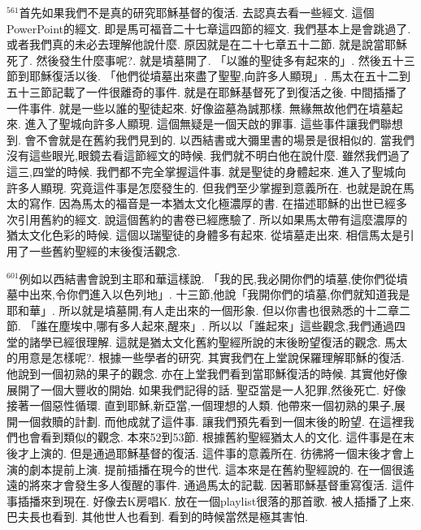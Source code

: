 \documentclass{book}
\begin{document}
$^{561}$首先如果我們不是真的研究耶穌基督的復活.
去認真去看一些經文.
這個PowerPoint的經文.
即是馬可福音二十七章這四節的經文.
我們基本上是會跳過了.
或者我們真的未必去理解他說什麼.
原因就是在二十七章五十二節.
就是說當耶穌死了.
然後發生什麼事呢?.
就是墳墓開了.
「以誰的聖徒多有起來的」.
然後五十三節到耶穌復活以後.
「他們從墳墓出來盡了聖聖,向許多人顯現」.
馬太在五十二到五十三節記載了一件很離奇的事件.
就是在耶穌基督死了到復活之後.
中間插播了一件事件.
就是一些以誰的聖徒起來.
好像盜墓為誠那樣.
無緣無故他們在墳墓起來.
進入了聖城向許多人顯現.
這個無疑是一個天啟的罪事.
這些事件讓我們聯想到.
會不會就是在舊約我們見到的.
以西結書或大彌里書的場景是很相似的.
當我們沒有這些眼光,眼鏡去看這節經文的時候.
我們就不明白他在說什麼.
雖然我們過了這三,四堂的時候.
我們都不完全掌握這件事.
就是聖徒的身體起來.
進入了聖城向許多人顯現.
究竟這件事是怎麼發生的.
但我們至少掌握到意義所在.
也就是說在馬太的寫作.
因為馬太的福音是一本猶太文化極濃厚的書.
在描述耶穌的出世已經多次引用舊約的經文.
說這個舊約的書卷已經應驗了.
所以如果馬太帶有這麼濃厚的猶太文化色彩的時候.
這個以瑞聖徒的身體多有起來.
從墳墓走出來.
相信馬太是引用了一些舊約聖經的末後復活觀念.

$^{601}$例如以西結書會說到主耶和華這樣說.
「我的民,我必開你們的墳墓,使你們從墳墓中出來,令你們進入以色列地」.
十三節,他說「我開你們的墳墓,你們就知道我是耶和華」.
所以就是墳墓開,有人走出來的一個形象.
但以你書也很熟悉的十二章二節.
「誰在塵埃中,哪有多人起來,醒來」.
所以以「誰起來」這些觀念,我們通過四堂的諸學已經很理解.
這就是猶太文化舊約聖經所說的末後盼望復活的觀念.
馬太的用意是怎樣呢?.
根據一些學者的研究.
其實我們在上堂說保羅理解耶穌的復活.
他說到一個初熟的果子的觀念.
亦在上堂我們看到當耶穌復活的時候.
其實他好像展開了一個大豐收的開始.
如果我們記得的話.
聖亞當是一人犯罪,然後死亡.
好像接著一個惡性循環.
直到耶穌,新亞當,一個理想的人類.
他帶來一個初熟的果子,展開一個救贖的計劃.
而他成就了這件事.
讓我們預先看到一個末後的盼望.
在這裡我們也會看到類似的觀念.
本來52到53節.
根據舊約聖經猶太人的文化.
這件事是在末後才上演的.
但是通過耶穌基督的復活.
這件事的意義所在.
彷彿將一個末後才會上演的劇本提前上演.
提前插播在現今的世代.
這本來是在舊約聖經說的.
在一個很遙遠的將來才會發生多人復醒的事件.
通過馬太的記載.
因著耶穌基督重寫復活.
這件事插播來到現在.
好像去K房唱K.
放在一個playlist很落的那首歌.
被人插播了上來.
巴夫長也看到.
其他世人也看到.
看到的時候當然是極其害怕.
\end{document}
